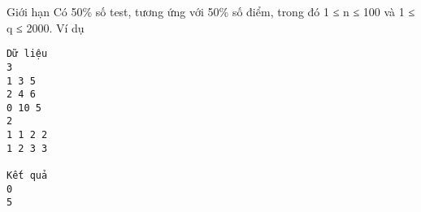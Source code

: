 Giới hạn
Có 50\% số test, tương ứng với 50\% số điểm, trong đó 1 ≤ n ≤ 100 và 1 ≤ q ≤ 2000.
Ví dụ
\begin{verbatim}
Dữ liệu
3 
1 3 5
2 4 6
0 10 5
2
1 1 2 2
1 2 3 3

Kết quả
0
5
\end{verbatim}